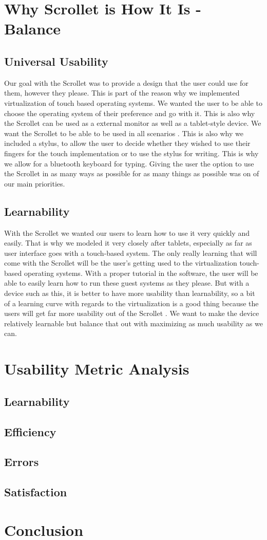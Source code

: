 \documentclass[a4paper]{article}
\begin{document}
\section{Why Scrollet is How It Is - Balance}
\subsection{Universal Usability}
Our goal with the Scrollet was to provide a design that the user could use for them, however they please. This is part of the reason why we implemented virtualization of touch based operating systems. We wanted the user to be able to choose the operating system of their preference and go with it. This is also why the Scrollet can be used as a external monitor as well as a tablet-style device. We want the Scrollet to be able to be used in all scenarios \cite{Nielsen}. This is also why we included a stylus, to allow the user to decide whether they wished to use their fingers for the touch implementation or to use the stylus for writing. This is why we allow for a bluetooth keyboard for typing. Giving the user the option to use the Scrollet in as many ways as possible for as many things as possible was on of our main priorities.

\subsection{Learnability}
With the Scrollet we wanted our users to learn how to use it very quickly and easily. That is why we modeled it very closely after tablets, especially as far as user interface goes with a touch-based system. The only really learning that will come with the Scrollet will be the user's getting used to the virtualization touch-based operating systems. With a proper tutorial in the software, the user will be able to easily learn how to run these guest systems as they please. But with a device such as this, it is better to have more usability than learnability, so a bit of a learning curve with regards to the virtualization is a good thing because the users will get far more usability out of the Scrollet \cite{Tog}. We want to make the device relatively learnable but balance that out with maximizing as much usability as we can.


\section{Usability Metric Analysis}
\subsection{Learnability}
\subsection{Efficiency}
\subsection{Errors}
\subsection{Satisfaction}

\section{Conclusion}




\end{document}
